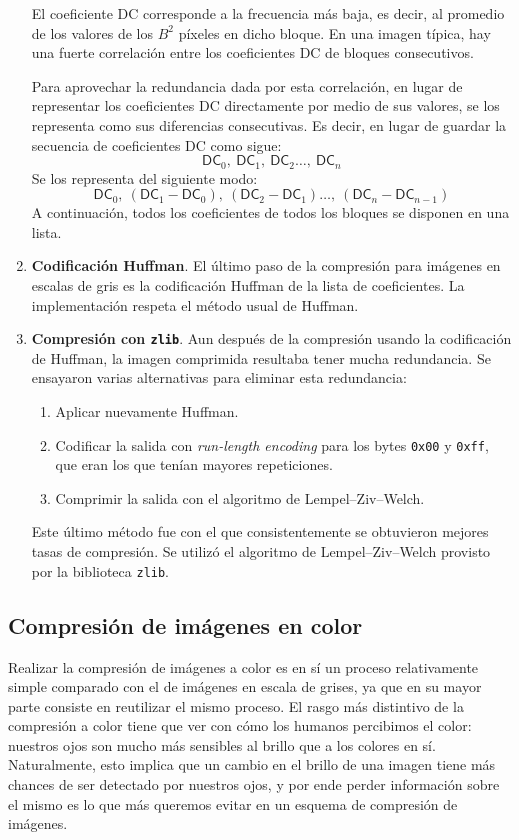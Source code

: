 \documentclass{article}
\begin{document}
\begin{enumerate}
  El coeficiente DC corresponde a la frecuencia más baja, es
  decir, al promedio de los valores de los $B^2$ píxeles en
  dicho bloque.
  En una imagen típica, hay una fuerte correlación entre los
  coeficientes DC de bloques consecutivos.

  Para aprovechar la redundancia dada por esta correlación,
  en lugar de representar los coeficientes DC directamente por
  medio de sus valores,
  se los representa como sus diferencias consecutivas.
  Es decir, en lugar de guardar la secuencia de coeficientes
  DC como sigue:
  \[
    \mathsf{DC}_0,\ \mathsf{DC}_1,\ \mathsf{DC}_2 \hdots,\ \mathsf{DC}_n
  \]
  Se los representa del siguiente modo:
  \[
    \mathsf{DC}_0,\ (\mathsf{DC}_1 - \mathsf{DC}_0),\ (\mathsf{DC}_2 - \mathsf{DC}_1) \hdots,\ (\mathsf{DC}_n - \mathsf{DC}_{n-1})
  \]
  A continuación, todos los coeficientes de todos los bloques
  se disponen en una lista.
\item
  {\bf Codificación Huffman}.
  El último paso de la compresión para imágenes en escalas de
  gris es la codificación Huffman de la lista de coeficientes.
  La implementación respeta el método usual de Huffman.
\item
  {\bf Compresión con \texttt{zlib}}.
  Aun después de la compresión usando la codificación de Huffman,
  la imagen comprimida resultaba tener mucha redundancia.
  Se ensayaron varias alternativas para eliminar esta redundancia:
  \begin{enumerate}
  \item Aplicar nuevamente Huffman.
  \item Codificar la salida con {\em run-length encoding} para los bytes
        \texttt{0x00} y \texttt{0xff},
        que eran los que tenían mayores repeticiones.
  \item Comprimir la salida con el algoritmo de Lempel--Ziv--Welch.
  \end{enumerate}
  Este último método fue con el que consistentemente se obtuvieron
  mejores tasas de compresión.
  Se utilizó el algoritmo de Lempel--Ziv--Welch provisto por la
  biblioteca \texttt{zlib}.
\end{enumerate}

\subsection{Compresión de imágenes en color}

Realizar la compresión de imágenes a color es en sí un proceso relativamente simple comparado con el de imágenes en escala de grises, ya que en su mayor parte consiste en reutilizar el mismo proceso. El rasgo más distintivo de la compresión a color tiene que ver con cómo los humanos percibimos el color: nuestros ojos son mucho más sensibles al brillo que a los colores en sí. Naturalmente, esto implica que un cambio en el brillo de una imagen tiene más chances de ser detectado por nuestros ojos, y por ende perder información sobre el mismo es lo que más queremos evitar en un esquema de compresión de imágenes.
\end{document}
